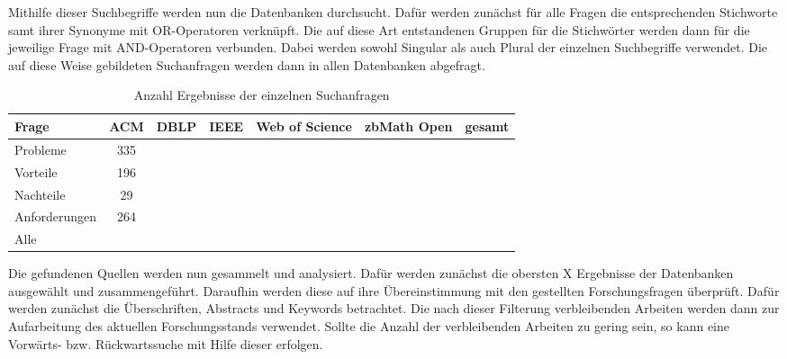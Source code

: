 Mithilfe dieser Suchbegriffe werden nun die Datenbanken durchsucht. Dafür werden zunächst für alle Fragen die entsprechenden Stichworte samt ihrer Synonyme mit OR-Operatoren verknüpft. Die auf diese Art entstandenen Gruppen für die Stichwörter werden dann für die jeweilige Frage mit AND-Operatoren verbunden. Dabei werden sowohl Singular als auch Plural der einzelnen Suchbegriffe verwendet. Die auf diese Weise gebildeten Suchanfragen werden dann in allen Datenbanken abgefragt.

\begin{table}[htbp]
    \centering
    \begin{tabular}{|l|c|c|c|c|c|c|}
        \hline
        Frage         & ACM & DBLP & IEEE & Web of Science & zbMath Open & gesamt \\
        \hline
        Probleme      & 335 &      &      &                &             &        \\
        \hline
        Vorteile      & 196 &      &      &                &             &        \\
        \hline
        Nachteile     & 29  &      &      &                &             &        \\
        \hline
        Anforderungen & 264 &      &      &                &             &        \\
        \hline
        Alle          &     &      &      &                &             &        \\
        \hline
    \end{tabular}
    \caption{Anzahl Ergebnisse der einzelnen Suchanfragen}
    \label{table:amount-search-results}
\end{table}

Die gefundenen Quellen werden nun gesammelt und analysiert. Dafür werden zunächst die obersten X Ergebnisse der Datenbanken ausgewählt und zusammengeführt. Daraufhin werden diese auf ihre Übereinstimmung mit den gestellten Forschungsfragen überprüft. Dafür werden zunächst die Überschriften, Abstracts und Keywords betrachtet. Die nach dieser Filterung verbleibenden Arbeiten werden dann zur Aufarbeitung des aktuellen Forschungsstands verwendet. Sollte die Anzahl der verbleibenden Arbeiten zu gering sein, so kann eine Vorwärts- bzw. Rückwartssuche mit Hilfe dieser erfolgen.